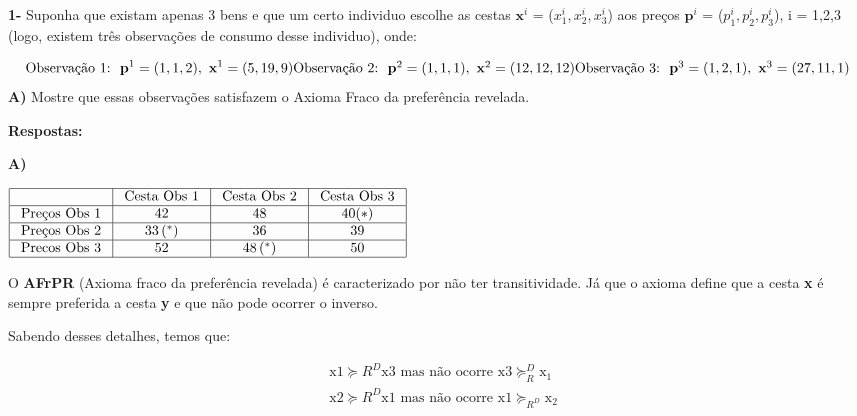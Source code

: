 \begin{flushleft}
\singlespacing

\textbf{1-} Suponha que existam apenas 3 bens e que um certo individuo escolhe as cestas $\textbf{x}^{i}$ = ($x_{1}^{i},x_{2}^{i},x_{3}^{i}$) aos preços $\textbf{p}^{i}$ = ($p_{1}^{i},p_{2}^{i},p_{3}^{i}$), i = 1,2,3 (logo, existem três observações de consumo desse
individuo), onde:

\begin{equation}
\text{Observação 1:} \ \  \textbf{p}^{1} = (1,1,2), \ \textbf{x}^{1} = (5,19,9)
$$\\$$
\text{Observação 2:} \ \  \textbf{p}^{2} = (1,1,1), \ \textbf{x}^{2} = (12,12,12)
$$\\$$
\text{Observação 3:} \ \  \textbf{p}^{3} = (1,2,1), \ \textbf{x}^{3} = (27,11,1)
\end{equation}
\singlespacing
\textbf{A)} Mostre que essas observações satisfazem o Axioma Fraco da preferência revelada.

\singlespacing

\textbf{Respostas:}

\textbf{A)} 
\begin{center}

$\begin{array}{|l|c|c|c|}
	\hline & \text { Cesta Obs 1 } & \text { Cesta Obs 2 } & \text { Cesta Obs 3 } \\
	\hline \text { Preços Obs 1 } & 42 & 48 & 40(*) \\
	\hline \text { Preços Obs 2 } & 33\left(^{*}\right) & 36 & 39 \\
	\hline \text { Precos Obs 3 } & 52 & 48\left(^{*}\right) & 50 \\
	\hline
\end{array}$
\end{center}
\singlespacing
O \textbf{AFrPR} (Axioma fraco da preferência revelada) é caracterizado por não ter transitividade. Já que o axioma define que a cesta \textbf{x} é sempre preferida a cesta \textbf{y} e que não pode ocorrer o inverso.

Sabendo desses detalhes, temos que:

\begin{equation}
\begin{aligned}
&\mathrm{x}{1} \succeq{R}^{D} \mathrm{x}{3} \text { mas não ocorre } \mathrm{x}{3} \succeq_{R}^{D} \mathrm{x}_{1}\\
&\mathrm{x}{2} \succeq{R^{D}} \mathrm{x}{1} \text { mas não ocorre } \mathrm{x}{1} \succeq_{R^{D}} \mathrm{x}_{2}\\
\end{aligned}
\end{equation}


\end{flushleft}
